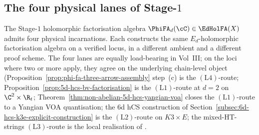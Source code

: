 \subsection{The four physical lanes of Stage-\texorpdfstring{$1$}{1}}
\label{subsec:four-physical-lanes-stage-1}

The Stage-$1$ holomorphic factorisation algebra
$\PhiFA_d(\cC) \in \EdHolFA(X)$ admits four physical incarnations.
Each constructs the same $E_d$-holomorphic factorisation algebra on a
verified locus, in a different ambient and a different proof scheme.
The four lanes are equally load-bearing in Vol~III; on the loci where
two or more apply, they agree on the underlying chain-level object
(Proposition~\ref{prop:phi-fa-three-arrow-assembly} step~(c) is the
$(\mathrm{L4})$-route; Proposition~\ref{prop:5d-hcs-bv-factorisation}
is the $(\mathrm{L1})$-route at $d = 2$ on $\C^2 \times \R_t$;
Theorem~\ref{thm:non-abelian-5d-hcs-yangian-voa} closes the
$(\mathrm{L1})$-route to a Yangian VOA quantisation; the $6$d hCS
construction of Section~\ref{subsec:6d-hcs-k3e-explicit-construction}
is the $(\mathrm{L2})$-route on $K3 \times E$; the mixed-HT-strings
$(\mathrm{L3})$-route is the local realisation of
\cite{LorgatMixedHTStrings}.

